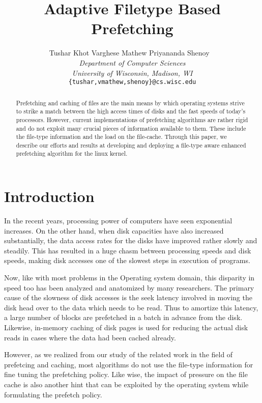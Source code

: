 \documentclass[twocolumn,10pt]{article}
\title{\bf \textsf{Adaptive Filetype Based Prefetching}}
\author{ Tushar Khot \hspace{20pt} Varghese Mathew \hspace{20pt}  Priyananda Shenoy \
\\
       {\em \normalsize Department of Computer Sciences}\\
       {\em \normalsize University of Wisconsin, Madison, WI}\\
       {\tt \normalsize \{tushar,vmathew,shenoy\}@cs.wisc.edu}}
\begin{document}
\date{}
\raggedbottom

\maketitle

\pagestyle{plain}\setlength{\footskip}{25pt}

\onehalfspacing

\begin{abstract}
\small
Prefetching and caching of files are the main means by which operating 
systems strive to strike a match between the high access times of disks
and the fast speeds of today's processors. However, 
current implementations of prefetching algorithms are rather rigid and
do not exploit many crucial pieces of information available to them.
These include the file-type information and the load on the file-cache.
Through this paper, we describe our efforts and results at developing
and deploying a file-type aware enhanced prefetching algorithm for the
linux kernel.
\end{abstract}

\section{Introduction}
In the recent years, processing power of computers have seen exponential
increases. On the other hand, when disk capacities have also increased
substantially, the data access rates for the disks have improved rather
slowly and steadily. This has resulted in a huge chasm between processing
speeds and disk speeds, making disk accesses one of the slowest steps in
execution of programs.

Now, like with most problems in the Operating system domain, this 
disparity in speed too has been analyzed and anatomized by many 
researchers. The primary cause of the slowness of disk accesses is the
seek latency involved in moving the disk head over to the data which 
needs to be read. Thus to amortize this latency, a large number of blocks are prefetched in a batch in advance from the disk. Likewise, in-memory
caching of disk pages is used for reducing the actual disk reads in cases where the data had been cached already.

However, as we realized from our study of the related work in the field of
prefetcing and caching, most algorithms do not use the file-type information for fine tuning the prefetching policy. Like wise, the impact of pressure on the file cache is also another hint that can be exploited
by the operating system while formulating the prefetch policy.
\end{document}
